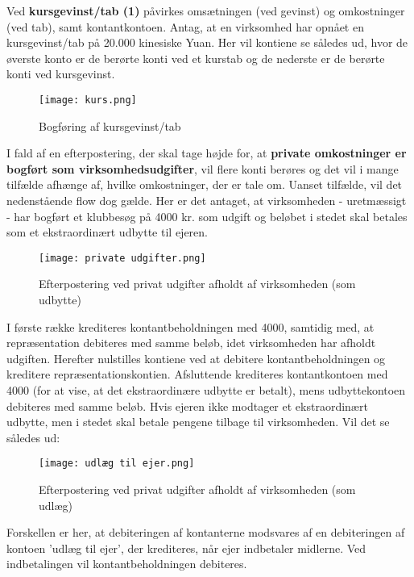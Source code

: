 \documentclass[10pt,reqno, usenames]{article}
\begin{document}
Ved \textbf{kursgevinst/tab (1)} påvirkes omsætningen (ved gevinst) og omkostninger (ved tab), samt kontantkontoen. Antag, at en virksomhed har opnået en kursgevinst/tab på 20.000 kinesiske Yuan. Her vil kontiene se således ud, hvor de øverste konto er de berørte konti ved et kurstab og de nederste er de berørte konti ved kursgevinst. 

\begin{figure}[h]
     \centering
     \texttt{[image: kurs.png]}
     \caption{Bogføring af kursgevinst/tab}
     \label{Figur 1}
\end{figure} 

I fald af en efterpostering, der skal tage højde for, at \textbf{private omkostninger er bogført som virksomhedsudgifter}, vil flere konti berøres og det vil i mange tilfælde afhænge af, hvilke omkostninger, der er tale om. Uanset tilfælde, vil det nedenstående flow dog gælde. Her er det antaget, at virksomheden - uretmæssigt - har bogført et klubbesøg på 4000 kr. som udgift og beløbet i stedet skal betales som et ekstraordinært udbytte til ejeren. 

\begin{figure}[h]
     \centering
     \texttt{[image: private udgifter.png]}
     \caption{Efterpostering ved privat udgifter afholdt af virksomheden (som udbytte)}
     \label{Figur 1}
\end{figure} 

I første række krediteres kontantbeholdningen med 4000, samtidig med, at repræsentation debiteres med samme beløb, idet virksomheden har afholdt udgiften. Herefter nulstilles kontiene ved at debitere kontantbeholdningen og kreditere repræsentationskontien. Afsluttende krediteres kontantkontoen med 4000 (for at vise, at det ekstraordinære udbytte er betalt), mens udbyttekontoen debiteres med samme beløb. Hvis ejeren ikke modtager et ekstraordinært udbytte, men i stedet skal betale pengene tilbage til virksomheden. Vil det se således ud: 

\begin{figure}[h]
     \centering
     \texttt{[image: udlæg til ejer.png]}
     \caption{Efterpostering ved privat udgifter afholdt af virksomheden (som udlæg)}
     \label{Figur 1}
\end{figure} 

Forskellen er her, at debiteringen af kontanterne modsvares af en debiteringen af kontoen 'udlæg til ejer', der krediteres, når ejer indbetaler midlerne. Ved indbetalingen vil kontantbeholdningen debiteres. 
\end{document}

